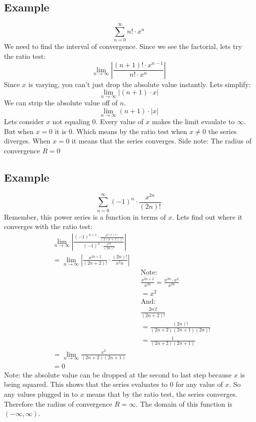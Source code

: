 \documentclass{article}
\begin{document}
    \subsection{Example}
        \[\sum_{n=0}^{\infty} n! \cdot x^n \]
        We need to find the interval of convergence.
        Since we see the factorial, lets try the ratio test:
        \[\lim_{n \to \infty} \left| \frac{(n+1)!\cdot x^{n-1}}{n! \cdot x^n}\right|\]
        Since \(x\) is varying, you can't just drop the absolute value instantly.
        Lets simplify:
        \[\lim_{n \to \infty} \left| (n+1) \cdot x\right|\]
        We can strip the absolute value off of \(n\).
        \[\lim_{n \to \infty} (n+1) \cdot |x| \]
        Lets consider \(x\) not equaling 0. 
        Every value of \(x\) makes the limit evaulate to \(\infty\).
        But when \(x = 0\) it is 0.
        Which means by the ratio test when \(x \neq 0\) the series diverges.
        When \(x = 0\) it means that the series converges.
        Side note: The radius of convergence \(R = 0\) 
    
    \subsection{Example}
        \[\sum_{n=0}^{\infty}  (-1)^n \cdot \frac{x^{2n}}{(2n)!}\]
        Remember, this power series is a function in terms of \(x\).
        Lets find out where it converges with the ratio test:
        \begin{align*}
            &\lim_{n \to \infty} \left| \frac{(-1)^{n+1} \cdot \frac{x^{2(n+1)}}{(2(n+1))!}}{(-1)^n \cdot \frac{x^{2n}}{(2n)!}}\right| \\
            &= \lim_{n \to \infty}  \left| \frac{x^{2n+2}}{(2n+2)!} \cdot \frac{(2n)!}{x^2n}\right| \\
            && & \text{Note:} \\
            && & \frac{x^{2n+2}}{x^{2n}} = \frac{x^{2n} \cdot x^2}{x^{2n}} \\
            && &= x^2 \\
            && & \text{And:} \\
            && & \frac{2n)!}{(2n + 2)!} \\
            && &= \frac{(2n)!}{(2n+2)(2n+1)(2n)!} \\
            && &= \frac{1}{(2n+2)(2n+1)} \\
            &= \lim_{n \to \infty} \frac{x^2}{(2n+2)(2n+1)} \\
            &= 0
        \end{align*}
        Note: the absolute value can be dropped at the second to last step because \(x\) is being squared.
        This shows that the series evaluates to 0 for any value of \(x\).
        So any values plugged in to \(x\) means that by the ratio test, the series converges.
        Therefore the radius of convergence \(R = \infty\).
        The domain of this function is \((-\infty, \infty)\).
        
\end{document}
